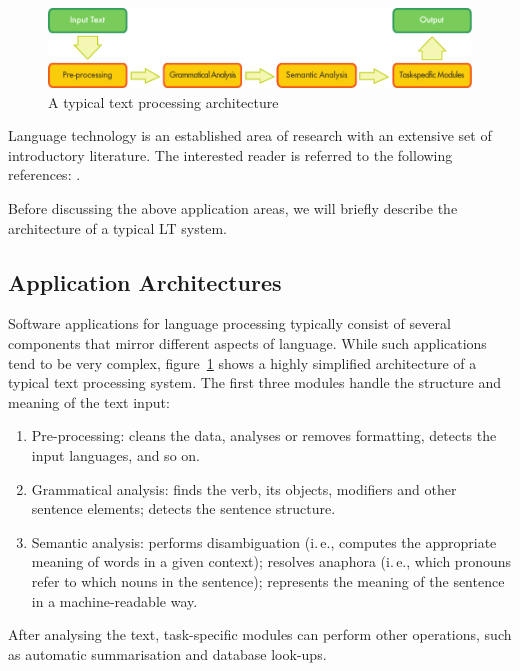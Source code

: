 \begin{multicols}{2}
\begin{figure}[b]
  \center
  \includegraphics[width=\textwidth]{../_media/english/text_processing_app_architecture}
  \caption{A typical text processing architecture}
  \label{fig:textprocessingarch_en}
\end{figure}

Language technology is an established area of research with an extensive set of introductory literature. The interested reader is referred to the following references:  \cite{carstensen-etal1, jurafsky-martin01, manning-schuetze1, lt-world1, lt-survey1}.

Before discussing the above application areas, we will briefly describe the architecture of a typical LT system.

\subsection{Application Architectures}

Software applications for language processing typically consist of several components that mirror different aspects of language. While such applications tend to be very complex, figure~\ref{fig:textprocessingarch_en} shows a highly simplified architecture of a typical text processing system. The first three modules handle the structure and meaning of the text input:

\begin{enumerate}
\item Pre-processing: cleans the data, analyses or removes formatting, detects the input languages, and so on.
\item Grammatical analysis: finds the verb, its objects, modifiers and other sentence elements; detects the sentence structure.
\item Semantic analysis: performs disambiguation (i.\,e., computes the appropriate meaning of words in a given context); resolves anaphora (i.\,e., which pronouns refer to which nouns in the sentence); represents the meaning of the sentence in a machine-readable way.
\end{enumerate}

After analysing the text, task-specific modules can perform other operations, such as automatic summarisation and database look-ups.


\end{multicols}
